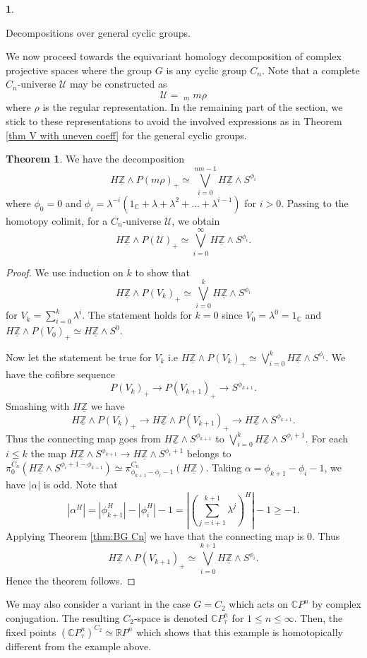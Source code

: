 \documentclass[a4paper,leqno,11pt]{amsart}
\theoremstyle{plain}
\theoremstyle{definition}
\newtheorem{subsec}[theorem]{}
\newtheorem{thm}[theorem]{Theorem}
\theoremstyle{remark}
\theoremstyle{definition}
\newcommand{\C}{{\mathbb C}}
\newcommand{\ra}{\rightarrow}
\newenvironment{mysubsection}[2][]
{\begin{subsec}\begin{upshape}\begin{bfseries}{#2.}
			\end{bfseries}{#1}}
		{\end{upshape}\end{subsec}}
\newcommand{\uZ}{\underline{\mathbb{Z}}}
\def\a{\alpha}
\def\lam{\lambda}
\def\sU{\mathcal{U}}
\def\C{\mathbb{C}}
\def\ra{\rightarrow}
\numberwithin{equation}{section}
\newcommand{\smas}{\wedge}
\begin{document}
	
\begin{mysubsection}{Decompositions over general cyclic groups}
	We now proceed towards the equivariant homology decomposition of complex projective spaces where the group $G$ is any cyclic group $C_n$. Note that a complete $C_n$-universe $\sU$ may be constructed as 
$$\sU = \mathop{\lim_{\longrightarrow}}_{m} m\rho$$ 
where $\rho$ is the regular representation. In the remaining part of the section, we stick to these representations to avoid the involved expressions as in Theorem \ref{thm V with uneven coeff} for the general cyclic groups.
	\begin{thm}\label{thm main simple}
		We have the decomposition 
		$$H\uZ\smas P(m\rho)_+ \simeq \bigvee_{i=0}^{nm-1}H\uZ\smas S^{\phi_{i}}$$ 
		where $\phi_{0}= 0$ and $\phi_{i} =\lam^{-i}(1_\C+ \lam + \lam^2 +\dots + \lam^{i-1})$ for $i> 0$. Passing to the homotopy colimit, for a $C_n$-universe $\sU$, we obtain 
		$$H\uZ\smas P(\sU)_+ \simeq \bigvee_{i=0}^{\infty}H\uZ\smas S^{\phi_{i}}.$$
	\end{thm}
	
	\begin{proof}
		We use induction on $k$ to show that 
		$$H\uZ\smas P(V_{k})_{+}\simeq \bigvee_{i=0}^{k}H\uZ\smas S^{\phi_{i}}$$
		for  $V_{k}=\sum_{i=0}^{k}\lam^{i}$. 
		The statement holds for $k=0$ since $V_{0}= \lam^0 = 1_{\C}$ and $H\uZ\smas P(V_{0})_+ \simeq H\uZ\smas S^0$. 
		
		Now let the statement be true for $V_{k}$ i.e $H\uZ\smas P(V_k)_+ \simeq \bigvee_{i=0}^{k} H\uZ\smas S^{\phi_{i}}$. We have the cofibre sequence 
		$$P(V_k)_+\ra P(V_{k+1})_+\ra S^{\phi_{k+1}}.$$
		Smashing with $H\uZ$ we have 
		$$H\uZ\smas P(V_k)_+\ra H\uZ \smas P(V_{k+1})_+\ra H\uZ \smas S^{\phi_{k+1}}.$$
		Thus the connecting map goes from $H\uZ\smas S^{\phi_{k+1}}$ to $\bigvee_{i=0}^{k} H\uZ\smas S^{\phi_{i}+1}$. For each $i\leq k$ the map $H\uZ\smas S^{\phi_{k+1}}\ra H\uZ\smas S^{\phi_{i}+1}$ belongs to $\pi_{0}^{C_{n}}(H\uZ\smas S^{\phi_{i}+1-\phi_{k+1}})\simeq \pi_{\phi_{k+1}-\phi_{i}-1}^{C_n}(H\uZ)$. Taking $\a =\phi_{k+1}-\phi_{i}-1$, we have $|\a|$ is odd. Note that 
		$$|\a^{H}| = |\phi_{k+1}^{H}|-|\phi_{i}^{H}|-1= |(\sum_{j=i+1}^{k+1}\lam^{j})^{H}| - 1 \geq -1.$$ 
		Applying Theorem \ref{thm:BG Cn} we have that the connecting map is $0$. Thus 
		$$H\uZ\smas P(V_{k+1})_+ \simeq \bigvee_{i=0}^{k+1} H\uZ \smas S^{\phi_{i}}.$$
		Hence the theorem follows.
	\end{proof}
	
	We may also consider a variant in the case $G=C_{2}$ which acts on $\C P^{n}$ by complex conjugation. The resulting $C_{2}$-space is denoted ${\C P}_{\tau}^n$ for $1\leq n \leq \infty$. Then, the fixed points $(\C P^{n}_{\tau})^{C_{2}} \simeq \mathbb{R} P^n$ which shows that this example is homotopically different from the example above.
	

\end{mysubsection}
\end{document}
